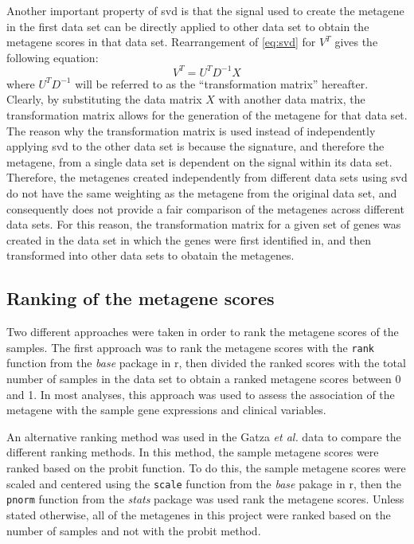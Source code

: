 Another important property of \gls{svd} is that the signal used to create the metagene in the first data set can be directly applied to other data set to obtain the metagene scores in that data set.
Rearrangement of \cref{eq:svd} for $V^T$ gives the following equation:
\begin{equation}
	\label{eq:transmat}
	V^T = U^{T}D^{-1}X
\end{equation}
where $U^{T}D^{-1}$ will be referred to as the ``transformation matrix'' hereafter.
Clearly, by substituting the data matrix $X$ with another data matrix, the transformation matrix allows for the generation of the metagene for that data set.
The reason why the transformation matrix is used instead of independently applying \gls{svd} to the other data set is because the signature, and therefore the metagene, from a single data set is dependent on the signal within its data set.
Therefore, the metagenes created independently from different data sets using \gls{svd} do not have the same weighting as the metagene from the original data set, and consequently does not provide a fair comparison of the metagenes across different data sets.
For this reason, the transformation matrix for a given set of genes was created in the data set in which the genes were first identified in, and then transformed into other data sets to obatain the metagenes.

\subsection{Ranking of the metagene scores}
\label{sub:ranking_of_the_metagene_scores}

Two different approaches were taken in order to rank the metagene scores of the samples.
The first approach was to rank the metagene scores with the \texttt{rank} function from the \textit{base} package in \gls{r}, then divided the ranked scores with the total number of samples in the data set to obtain a ranked metagene scores between 0 and 1.
In most analyses, this approach was used to assess the association of the metagene with the sample gene expressions and clinical variables.

An alternative ranking method was used in the Gatza \textit{et al.} data to compare the different ranking methods.
In this method, the sample metagene scores were ranked based on the probit function.
To do this, the sample metagene scores were scaled and centered using the \texttt{scale} function from the \textit{base} pakage in \gls{r}, then the \texttt{pnorm} function from the \textit{stats} package was used rank the metagene scores.
Unless stated otherwise, all of the metagenes in this project were ranked based on the number of samples and not with the probit method.

